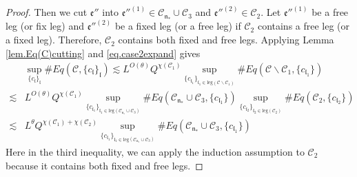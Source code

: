 \begin{proof}
Then we cut $\mathfrak{e}''$ into $\mathfrak{e}''^{(1)}\in  \mathcal{C}_{\mathfrak{n}_*}\cup \mathcal{C}_3$ and $\mathfrak{e}''^{(2)}\in  \mathcal{C}_2$. Let $\mathfrak{e}''^{(1)}$ be a free leg (or fix leg) and $\mathfrak{e}''^{(2)}$ be a fixed leg (or a free leg) if $\mathcal{C}_2$ contains a free leg (or a fixed leg). Therefore, $\mathcal{C}_2$ contains both fixed and free legs. Applying Lemma \ref{lem.Eq(C)cutting} and \eqref{eq.case2expand} gives
\begin{equation}\label{eq.case2expand'}
\begin{split}
    &\sup_{\{c_{\mathfrak{l}}\}_{\mathfrak{l}}}\#Eq(\mathcal{C},\{c_{\mathfrak{l}}\}_{\mathfrak{l}})
    \lesssim  L^{O(\theta)} Q^{\chi(\mathcal{C}_1)}\sup_{\{c_{\mathfrak{l}_1}\}_{\mathfrak{l}_1\in \text{leg}(\mathcal{C}\backslash\mathcal{C}_1)} } \# Eq(\mathcal{C}\backslash\mathcal{C}_1,\{c_{\mathfrak{l}_1}\})
    \\
    \lesssim& L^{O(\theta)} Q^{\chi(\mathcal{C}_1)}\sup_{\{c_{\mathfrak{l}_1}\}_{\mathfrak{l}_1\in \text{leg}(\mathcal{C}_{\mathfrak{n}_*}\cup \mathcal{C}_3)} } \# Eq(\mathcal{C}_{\mathfrak{n}_*}\cup \mathcal{C}_3,\{c_{\mathfrak{l}_1}\}) \sup_{\{c_{\mathfrak{l}_2}\}_{\mathfrak{l}_2\in \text{leg}(\mathcal{C}_2)} }\# Eq(\mathcal{C}_{2}, \{c_{\mathfrak{l}_2}\})
    \\
    \lesssim& L^\theta Q^{\chi(\mathcal{C}_1)+\chi(\mathcal{C}_2)}\sup_{\{c_{\mathfrak{l}_1}\}_{\mathfrak{l}_1\in \text{leg}(\mathcal{C}_{\mathfrak{n}_*}\cup \mathcal{C}_3)} } \# Eq(\mathcal{C}_{\mathfrak{n}_*}\cup \mathcal{C}_3,\{c_{\mathfrak{l}_1}\}) 
\end{split}
\end{equation}
Here in the third inequality, we can apply the induction assumption to $\mathcal{C}_2$ because it contains both fixed and free legs.


\end{proof}
